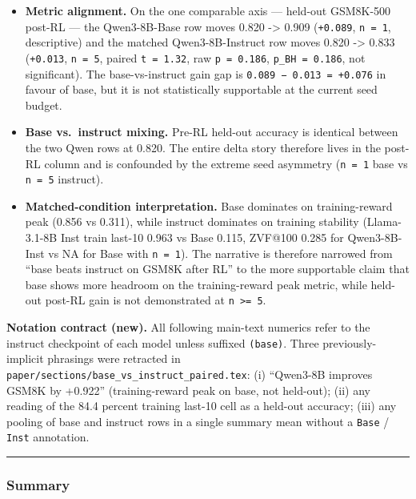 \documentclass[
  american,
  11pt,
  a4paper,
  oneside]{report}
\providecommand{\tightlist}{%
  \setlength{\itemsep}{0pt}\setlength{\parskip}{0pt}}
\begin{document}
\begin{itemize}
\tightlist
\item
  \textbf{Metric alignment.} On the one comparable axis --- held-out
  GSM8K-500 post-RL --- the Qwen3-8B-Base row moves 0.820
  -\textgreater{} 0.909 (\texttt{+0.089}, \texttt{n\ =\ 1}, descriptive)
  and the matched Qwen3-8B-Instruct row moves 0.820 -\textgreater{}
  0.833 (\texttt{+0.013}, \texttt{n\ =\ 5}, paired \texttt{t\ =\ 1.32},
  raw \texttt{p\ =\ 0.186}, \texttt{p\_BH\ =\ 0.186}, not significant).
  The base-vs-instruct gain gap is \texttt{0.089\ −\ 0.013\ =\ +0.076}
  in favour of base, but it is not statistically supportable at the
  current seed budget.
\item
  \textbf{Base vs.~instruct mixing.} Pre-RL held-out accuracy is
  identical between the two Qwen rows at 0.820. The entire delta story
  therefore lives in the post-RL column and is confounded by the extreme
  seed asymmetry (\texttt{n\ =\ 1} base vs \texttt{n\ =\ 5} instruct).
\item
  \textbf{Matched-condition interpretation.} Base dominates on
  training-reward peak (0.856 vs 0.311), while instruct dominates on
  training stability (Llama-3.1-8B Inst train last-10 0.963 vs Base
  0.115, ZVF@100 0.285 for Qwen3-8B-Inst vs NA for Base with
  \texttt{n\ =\ 1}). The narrative is therefore narrowed from ``base
  beats instruct on GSM8K after RL'' to the more supportable claim that
  base shows more headroom on the training-reward peak metric, while
  held-out post-RL gain is not demonstrated at
  \texttt{n\ \textgreater{}=\ 5}.
\end{itemize}

\textbf{Notation contract (new).} All following main-text numerics refer
to the instruct checkpoint of each model unless suffixed
\texttt{(base)}. Three previously-implicit phrasings were retracted in
\texttt{paper/sections/base\_vs\_instruct\_paired.tex}: (i) ``Qwen3-8B
improves GSM8K by +0.922'' (training-reward peak on base, not held-out);
(ii) any reading of the 84.4 percent training last-10 cell as a held-out
accuracy; (iii) any pooling of base and instruct rows in a single
summary mean without a \texttt{Base} / \texttt{Inst} annotation.

\begin{center}\rule{0.5\linewidth}{0.5pt}\end{center}

\subsubsection{Summary}\label{summary}
\end{document}
